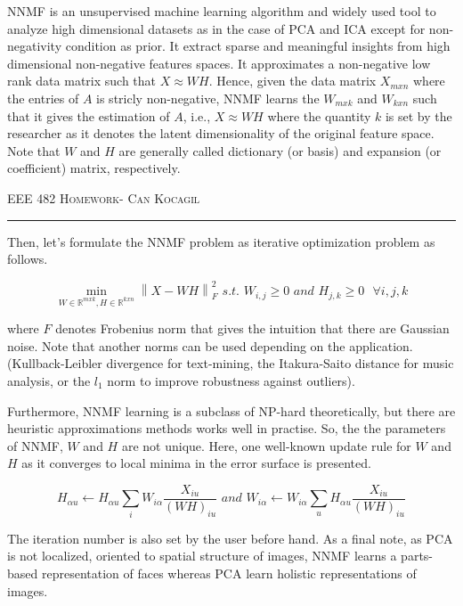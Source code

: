 \documentclass[12pt]{amsart}
\newcommand\norm[1]{\left\lVert#1\right\rVert}
\begin{document}
\bigskip
NNMF is an unsupervised machine learning algorithm and widely used tool to analyze high dimensional datasets as in the case of PCA and ICA except for non-negativity condition as prior. It extract sparse and meaningful insights from high dimensional non-negative features spaces. It approximates a non-negative low rank data matrix such that $X\approx WH$. Hence, given the data matrix $X_{mxn}$ where the entries of $A$ is stricly non-negative, NNMF learns the $W_{mxk}$ and $W_{kxn}$ such that it gives the estimation of $A$, i.e., $X \approx WH $ where the quantity $k$ is set by the researcher as it denotes the latent dimensionality of the original feature space. Note that $W$ and $H$ are generally called dictionary (or basis) and expansion (or coefficient) matrix, respectively.


\newpage
{\scshape EEE 482} \hfill {\scshape \large  Homework-\relax} \hfill {\scshape Can Kocagil}
\smallskip
\hrule
\vspace{2mm}

Then, let's formulate the NNMF problem as iterative optimization problem as follows.

\begin{equation}
    \operatorname*{min}_{W \in \mathbb{R}^{mxk},H \in \mathbb{R}^{kxn}} \norm{X-WH}_F^2 \textit{ s.t. } W_{i,j} \geq 0 \textit{ and } H_{j,k} \geq 0  \textit{ } \forall i,j,k
\end{equation}

where $F$ denotes Frobenius norm that gives the intuition that there are Gaussian noise. Note that another norms can be used depending on the application. (Kullback-Leibler divergence for text-mining, the Itakura-Saito distance for music analysis, or the $l_1$ norm to improve robustness against outliers).

\bigskip
Furthermore, NNMF learning is a subclass of NP-hard theoretically, but there are heuristic approximations methods works well in practise. So, the the parameters of NNMF, $W$ and $H$ are not unique. Here, one well-known update rule for $W$ and $H$ as it converges to local minima in the error surface is presented.

\begin{equation}
  H_{\alpha u}  \longleftarrow H_{\alpha u} \sum_{i} W_{i \alpha} \frac{X_{iu}}{(WH)_{iu}} \textit{ and }
  W_{i \alpha}  \longleftarrow W_{i \alpha} \sum_{u} H_{\alpha u } \frac{X_{iu}}{(WH)_{iu}}
\end{equation}

The iteration number is also set by the user before hand. As a final note, as PCA is not localized, oriented to spatial structure of images, NNMF learns a parts-based representation of faces whereas PCA learn holistic representations of images.
\end{document}

